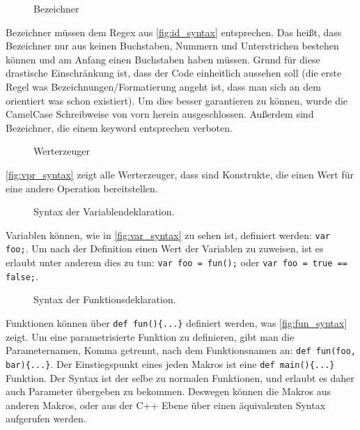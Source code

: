     \begin{figure}[H]
      \centering
      
      \caption{Bezeichner}
      \label{fig:id_syntax}
    \end{figure}
    Bezeichner müssen dem Regex aus \autoref{fig:id_syntax} entsprechen. Das heißt, dass Bezeichner nur aus keinen Buchstaben, Nummern und Unterstrichen bestehen können und am Anfang einen Buchstaben haben müssen. Grund für diese drastische Einschränkung ist, dass der Code einheitlich aussehen soll (die erste Regel was Bezeichnungen/Formatierung angeht ist, dass man sich an dem orientiert was schon existiert). Um dies besser garantieren zu können, wurde die CamelCase Schreibweise von vorn herein ausgeschlossen. Außerdem sind Bezeichner, die einem keyword entsprechen verboten.

    \begin{figure}[H]
      \centering
      
      \caption{Werterzeuger}
      \label{fig:vpr_syntax}
    \end{figure}
    \autoref{fig:vpr_syntax} zeigt alle Werterzeuger, dass sind Konstrukte, die einen Wert für eine andere Operation bereitstellen.

    \begin{figure}[H]
      \centering
      
      \caption{Syntax der Variablendeklaration.}
      \label{fig:var_syntax}
    \end{figure}
    Variablen können, wie in \autoref{fig:var_syntax} zu sehen ist, definiert werden: \lstinline[style=MyMacroStyle]$var foo;$. Um nach der Definition einen Wert der Variablen zu zuweisen, ist es erlaubt unter anderem dies zu tun: \lstinline[style=MyMacroStyle]$var foo = fun();$ oder \lstinline[style=MyMacroStyle]$var foo = true == false;$.

    \begin{figure}[H]
      \centering
      
      \caption{Syntax der Funktionsdeklaration.}
      \label{fig:fun_syntax}
    \end{figure}
    Funktionen können über \lstinline[style=MyMacroStyle]$def fun(){...}$ definiert werden, was \autoref{fig:fun_syntax} zeigt. Um eine parametrisierte Funktion zu definieren, gibt man die Parameternamen, Komma getrennt, nach dem Funktionsnamen an: \lstinline[style=MyMacroStyle]$def fun(foo, bar){...}$. Der Einstiegspunkt eines jeden Makros ist eine \lstinline[style=MyMacroStyle]$def main(){...}$ Funktion. Der Syntax ist der selbe zu normalen Funktionen, und erlaubt es daher auch Parameter übergeben zu bekommen. Deswegen können die Makros aus anderen Makros, oder aus der C++ Ebene über einen äquivalenten Syntax aufgerufen werden.

